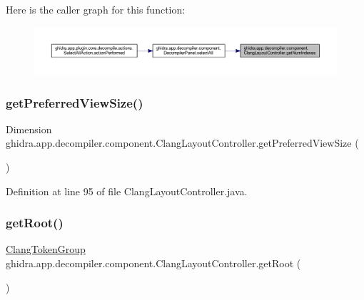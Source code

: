 Here is the caller graph for this function\+:
\nopagebreak
\begin{figure}[H]
\begin{center}
\leavevmode
\includegraphics[width=350pt]{classghidra_1_1app_1_1decompiler_1_1component_1_1_clang_layout_controller_a724aeb98b817a67d888b20d07328fde7_icgraph}
\end{center}
\end{figure}
\mbox{\label{classghidra_1_1app_1_1decompiler_1_1component_1_1_clang_layout_controller_a3be35395cbc7239f7cec8616d699e34b}} 
\subsubsection{\texorpdfstring{getPreferredViewSize()}{getPreferredViewSize()}}
{\footnotesize\ttfamily Dimension ghidra.\+app.\+decompiler.\+component.\+Clang\+Layout\+Controller.\+get\+Preferred\+View\+Size (\begin{DoxyParamCaption}{ }\end{DoxyParamCaption})\hspace{0.3cm}{\ttfamily [inline]}}



Definition at line 95 of file Clang\+Layout\+Controller.\+java.

\mbox{\label{classghidra_1_1app_1_1decompiler_1_1component_1_1_clang_layout_controller_a71a696ef859d8ef457c3f4e49bdfecc5}} 
\subsubsection{\texorpdfstring{getRoot()}{getRoot()}}
{\footnotesize\ttfamily \mbox{\hyperlink{classghidra_1_1app_1_1decompiler_1_1_clang_token_group}{Clang\+Token\+Group}} ghidra.\+app.\+decompiler.\+component.\+Clang\+Layout\+Controller.\+get\+Root (\begin{DoxyParamCaption}{ }\end{DoxyParamCaption})\hspace{0.3cm}{\ttfamily [inline]}}




